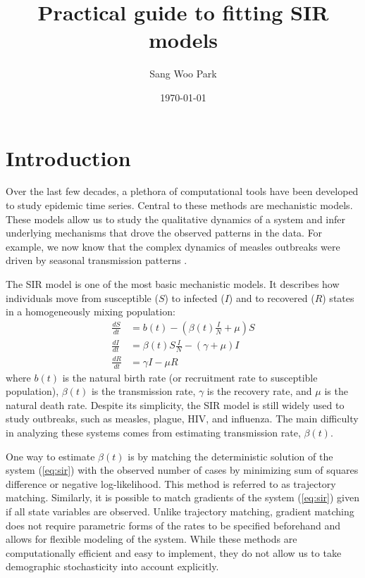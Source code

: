 \documentclass{article}
\title{Practical guide to fitting SIR models}
\date{\today}
\author{Sang Woo Park}
\newcommand{\eref}[1]{(\ref{eq:#1})}
\begin{document}
\maketitle

\pagebreak

\tableofcontents

\pagebreak


\section{Introduction}

Over the last few decades, a plethora of computational tools have been developed to study epidemic time series.
Central to these methods are mechanistic models.
These models allow us to study the qualitative dynamics of a system and infer underlying mechanisms that drove the observed patterns in the data.
For example, we now know that the complex dynamics of measles outbreaks were driven by seasonal transmission patterns \citep{earn2000simple}.


The SIR model is one of the most basic mechanistic models. It describes how individuals move from susceptible ($S$) to infected ($I$) and to recovered ($R$) states in a homogeneously mixing population:
\begin{equation}\label{eq:sir}
\begin{aligned}
\frac{dS}{dt} &= b(t) - \left(\beta(t) \frac{I}{N} + \mu \right) S\\
\frac{dI}{dt} &= \beta(t) S \frac{I}{N} - (\gamma + \mu) I\\
\frac{dR}{dt} &= \gamma I - \mu R
\end{aligned}
\end{equation}
where $b(t)$ is the natural birth rate (or recruitment rate to susceptible population), $\beta(t)$ is the transmission rate, $\gamma$ is the recovery rate, and $\mu$ is the natural death rate.
Despite its simplicity, the SIR model is still widely used to study outbreaks, such as measles, plague, HIV, and influenza.
The main difficulty in analyzing these systems comes from estimating transmission rate, $\beta(t)$.

One way to estimate $\beta(t)$ is by matching the deterministic solution of the system \eref{sir} with the observed number of cases by minimizing sum of squares difference or negative log-likelihood.
This method is referred to as trajectory matching.
Similarly, it is possible to match gradients of the system \eref{sir} given if all state variables are observed.
Unlike trajectory matching, gradient matching does not require parametric forms of the rates to be specified beforehand and allows for flexible modeling of the system.
While these methods are computationally efficient and easy to implement, they do not allow us to take demographic stochasticity into account explicitly.
\end{document}
